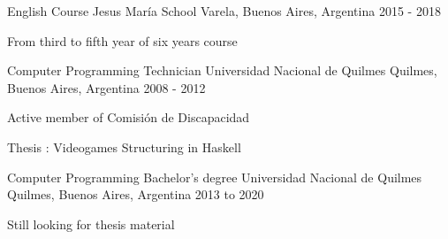 

\begin{cventries}

  \cventry
    {English Course} %
    {Jesus María School} %
    {Varela, Buenos Aires, Argentina} %
    {2015 - 2018} %
    {
      \begin{cvitems} %
        \item {From third to fifth year of six years course}
      \end{cvitems}
    }

  \cventry
    {Computer Programming Technician} %
    {Universidad Nacional de Quilmes} %
    {Quilmes, Buenos Aires, Argentina} %
    {2008 - 2012} %
    {
      \begin{cvitems} %
        \item {Active member of Comisión de Discapacidad}
        \item {Thesis : Videogames Structuring in Haskell}
      \end{cvitems}
    }

  \cventry
    {Computer Programming Bachelor's degree} %
    {Universidad Nacional de Quilmes} %
    {Quilmes, Buenos Aires, Argentina} %
    {2013 to 2020} %
    {
      \begin{cvitems} %
        \item {Still looking for thesis material}
      \end{cvitems}
    }


\end{cventries}
